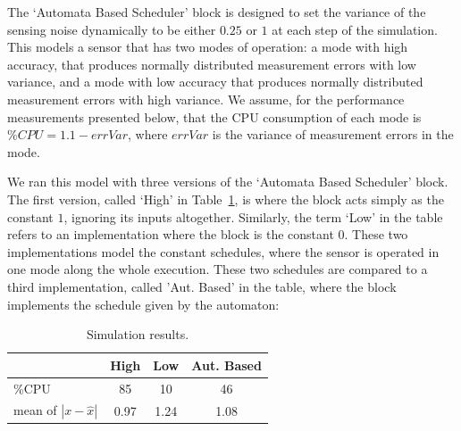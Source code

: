 \documentclass{sig-alternate-ipsn13}
\begin{document}
The `Automata Based Scheduler' block is designed to set the variance of the sensing noise dynamically to be either $0.25$ or $1$ at each step of the simulation. This models a sensor that has two modes of operation: a mode with high accuracy, that produces normally distributed measurement errors with low variance, and a mode with low accuracy that produces normally distributed measurement errors with high variance. We assume, for the performance measurements presented below, that the CPU consumption of each mode is $\%CPU=1.1-errVar$, where $errVar$ is the variance of measurement errors in the mode.

We ran this model with three versions of the `Automata Based Scheduler' block. The first version, called `High' in Table~\ref{tbl:sim-results}, is where the block acts simply as the constant $1$, ignoring its inputs altogether. Similarly, the term `Low' in the table refers to an implementation where the block is the constant $0$. These two implementations model the constant schedules, where the sensor is operated in one mode along the whole execution. These two schedules are compared to a third implementation, called 'Aut. Based' in the table, where the block implements the schedule given by the automaton:
\begin{center}
\end{center}

%
%

\begin{table}
	\centering
	\begin{tabular}{ |  l  | c | c | c | }
		\hline
		&  High & Low & Aut. Based \\ \hline \hline
		\%CPU                    & 85 & 10  & 46 \\ \hline
		mean of $|x -\hat{x}|$ & 0.97 & 1.24 & 1.08 \\ \hline
	\end{tabular}
	\caption{Simulation results.}
	\label{tbl:sim-results}
\end{table}
\end{document}
